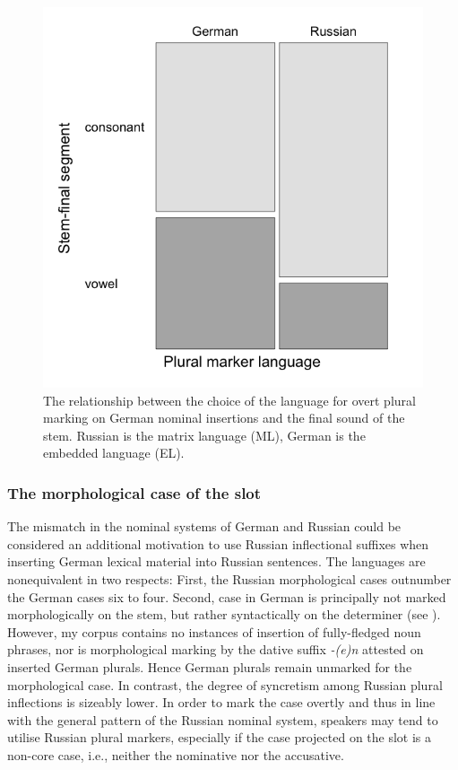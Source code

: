 \begin{figure}
\includegraphics[scale=0.5]{figures/6-Figure_3.png}	
\caption{The relationship between the choice of the language for overt plural marking on German nominal insertions and the final sound of the stem. Russian is the matrix language (ML), German is the embedded language (EL).\label{fig:6:3}}
\end{figure}

\subsubsection{The morphological case of the slot}

The mismatch in the nominal systems of German and Russian could be considered an additional motivation to use Russian inflectional suffixes when inserting German lexical material into Russian sentences. The  languages are nonequivalent in two respects: First, the Russian morphological cases outnumber the German cases six to four. Second, case in German is principally not marked morphologically on the stem, but rather syntactically on the determiner (see ). However, my corpus contains no instances of insertion of fully-fledged noun phrases, nor is morphological marking by the dative suffix \textit{-(e)n} attested on inserted German plurals. Hence German plurals remain unmarked for the morphological case. In contrast, the degree of syncretism among Russian plural inflections is sizeably lower. In order to mark the case overtly and thus in line with the general pattern of the Russian nominal system, speakers may tend to utilise Russian plural markers, especially if the case projected on the slot is a non-core case, i.e., neither the nominative nor the accusative.


